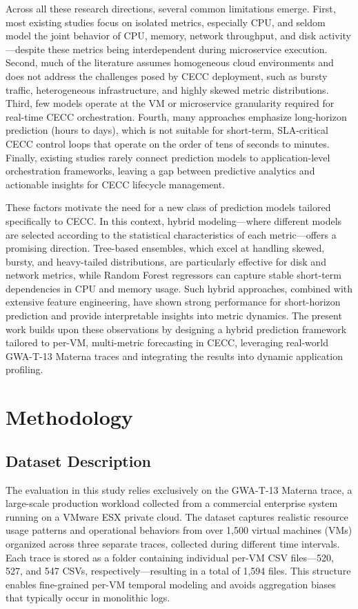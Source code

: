 \documentclass[a4paper,fleqn]{cas-dc}
\begin{document}
Across all these research directions, several common limitations emerge. First, most existing studies focus on isolated metrics, especially CPU, and seldom model the joint behavior of CPU, memory, network throughput, and disk activity---despite these metrics being interdependent during microservice execution. Second, much of the literature assumes homogeneous cloud environments and does not address the challenges posed by CECC deployment, such as bursty traffic, heterogeneous infrastructure, and highly skewed metric distributions. Third, few models operate at the VM or microservice granularity required for real-time CECC orchestration. Fourth, many approaches emphasize long-horizon prediction (hours to days), which is not suitable for short-term, SLA-critical CECC control loops that operate on the order of tens of seconds to minutes. Finally, existing studies rarely connect prediction models to application-level orchestration frameworks, leaving a gap between predictive analytics and actionable insights for CECC lifecycle management.

These factors motivate the need for a new class of prediction models tailored specifically to CECC. In this context, hybrid modeling---where different models are selected according to the statistical characteristics of each metric---offers a promising direction. Tree-based ensembles, which excel at handling skewed, bursty, and heavy-tailed distributions, are particularly effective for disk and network metrics, while Random Forest regressors can capture stable short-term dependencies in CPU and memory usage. Such hybrid approaches, combined with extensive feature engineering, have shown strong performance for short-horizon prediction and provide interpretable insights into metric dynamics. The present work builds upon these observations by designing a hybrid prediction framework tailored to per-VM, multi-metric forecasting in CECC, leveraging real-world GWA-T-13 Materna traces and integrating the results into dynamic application profiling.

\section{Methodology}
\label{sec:methodology}

\subsection{Dataset Description}
\label{subsec:dataset}

The evaluation in this study relies exclusively on the GWA-T-13 Materna trace, a large-scale production workload collected from a commercial enterprise system running on a VMware ESX private cloud. The dataset captures realistic resource usage patterns and operational behaviors from over 1,500 virtual machines (VMs) organized across three separate traces, collected during different time intervals. Each trace is stored as a folder containing individual per-VM CSV files---520, 527, and 547 CSVs, respectively---resulting in a total of 1,594 files. This structure enables fine-grained per-VM temporal modeling and avoids aggregation biases that typically occur in monolithic logs.
\end{document}
